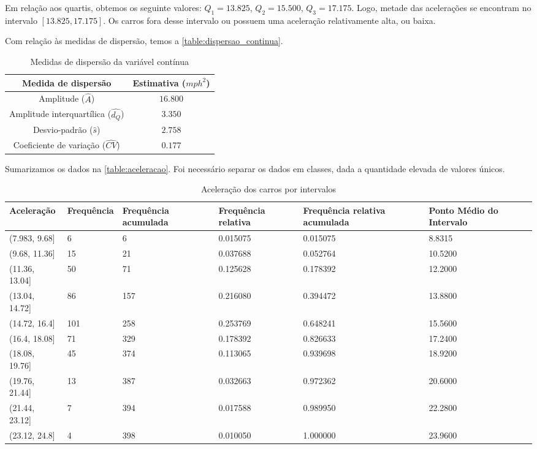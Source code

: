 \documentclass[brazil, a4paper, 12pt]{article}
\begin{document}
    Em relação aos quartis, obtemos os seguinte valores: $Q_1 = 13.825$, $Q_2 = 15.500$, $Q_3 = 17.175$. Logo, metade das acelerações se encontram no intervalo $[13.825, 17.175]$. Os carros fora desse intervalo ou possuem uma aceleração relativamente alta, ou baixa.

    Com relação às medidas de dispersão, temos a \autoref{table:dispersao_continua}.
    \begin{table}[htbp]
        \centering
        \begin{tabular}{cc}
            \toprule
            Medida de dispersão                   & Estimativa ($mph^2$)\\
            \midrule
            Amplitude ($\hat{A}$)                   & $16.800$ \\
            Amplitude interquartílica ($\hat{d_Q}$) & $3.350$ \\
            Desvio-padrão ($\hat{s}$)               & $2.758$ \\
            Coeficiente de variação ($\hat{CV}$)    & $0.177$ \\
            \bottomrule
        \end{tabular}
        \caption{Medidas de dispersão da variável contínua}
        \label{table:dispersao_continua}
    \end{table}
    \newpage
    Sumarizamos os dados na \autoref{table:aceleracao}. Foi necessário separar os dados em classes, dada a quantidade elevada de valores únicos.

    \begin{table}[htbp]
        \centering
        \begin{tabular}{C{2.5cm}|C{2.5cm}C{2.5cm}|C{2.5cm}C{2.5cm}|C{2.5cm}}
            \toprule
            Aceleração & Frequência & Frequência acumulada & Frequência relativa & Frequência relativa acumulada & Ponto Médio do Intervalo \\
            \midrule
            (7.983, 9.68] & 6 & 6 & 0.015075 & 0.015075 & 8.8315 \\
            (9.68, 11.36] & 15 & 21 & 0.037688 & 0.052764 & 10.5200 \\
            (11.36, 13.04] & 50 & 71 & 0.125628 & 0.178392 & 12.2000 \\
            (13.04, 14.72] & 86 & 157 & 0.216080 & 0.394472 & 13.8800 \\
            (14.72, 16.4] & 101 & 258 & 0.253769 & 0.648241 & 15.5600 \\
            (16.4, 18.08] & 71 & 329 & 0.178392 & 0.826633 & 17.2400 \\
            (18.08, 19.76] & 45 & 374 & 0.113065 & 0.939698 & 18.9200 \\
            (19.76, 21.44] & 13 & 387 & 0.032663 & 0.972362 & 20.6000 \\
            (21.44, 23.12] & 7 & 394 & 0.017588 & 0.989950 & 22.2800 \\
            (23.12, 24.8] & 4 & 398 & 0.010050 & 1.000000 & 23.9600 \\
            \bottomrule
        \end{tabular}
        \caption{Aceleração dos carros por intervalos}
        \label{table:aceleracao}
    \end{table}
\end{document}
